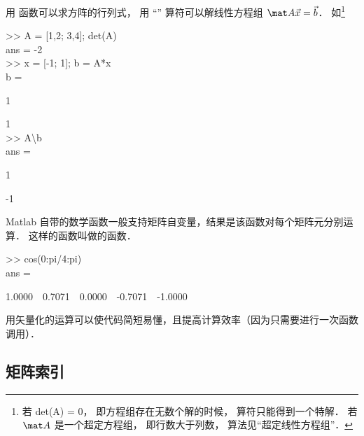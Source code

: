 用  函数可以求方阵的行列式， 用 “\x{\textbackslash}” 算符可以解线性方程组%
 $\mat A \vec x = \vec b$． 如\footnote{若 det(\mat A) = 0， 即方程组存在无数个解的时候， \x{\textbackslash} 算符只能得到一个特解． 若 $\mat A$ 是一个超定方程组， 即行数大于列数， 算法见“超定线性方程组”．}
\begin{Command}
>> A = [1,2; 3,4]; det(A)\\
ans = -2\\
>> x = [-1; 1]; b = A*x\\
b =\par 1\par 1\\
>> A\textbackslash b\\
ans = \par 1\par -1
\end{Command}

Matlab 自带的数学函数一般支持矩阵自变量，结果是该函数对每个矩阵元分别运算． 这样的函数叫做的函数．
\begin{Command}
>> cos(0:pi/4:pi)\\
ans = \par
1.0000\ \ 0.7071\ \ 0.0000\ \ -0.7071\ \ -1.0000
\end{Command}
用矢量化的运算可以使代码简短易懂，且提高计算效率（因为只需要进行一次函数调用）．


\subsection{矩阵索引}

